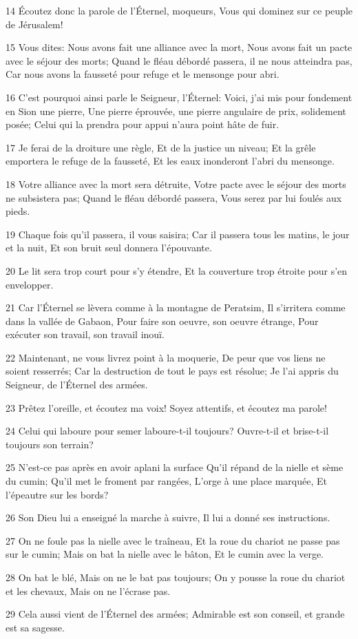 \par 14 Écoutez donc la parole de l'Éternel, moqueurs, Vous qui dominez sur ce peuple de Jérusalem!
\par 15 Vous dites: Nous avons fait une alliance avec la mort, Nous avons fait un pacte avec le séjour des morts; Quand le fléau débordé passera, il ne nous atteindra pas, Car nous avons la fausseté pour refuge et le mensonge pour abri.
\par 16 C'est pourquoi ainsi parle le Seigneur, l'Éternel: Voici, j'ai mis pour fondement en Sion une pierre, Une pierre éprouvée, une pierre angulaire de prix, solidement posée; Celui qui la prendra pour appui n'aura point hâte de fuir.
\par 17 Je ferai de la droiture une règle, Et de la justice un niveau; Et la grêle emportera le refuge de la fausseté, Et les eaux inonderont l'abri du mensonge.
\par 18 Votre alliance avec la mort sera détruite, Votre pacte avec le séjour des morts ne subsistera pas; Quand le fléau débordé passera, Vous serez par lui foulés aux pieds.
\par 19 Chaque fois qu'il passera, il vous saisira; Car il passera tous les matins, le jour et la nuit, Et son bruit seul donnera l'épouvante.
\par 20 Le lit sera trop court pour s'y étendre, Et la couverture trop étroite pour s'en envelopper.
\par 21 Car l'Éternel se lèvera comme à la montagne de Peratsim, Il s'irritera comme dans la vallée de Gabaon, Pour faire son oeuvre, son oeuvre étrange, Pour exécuter son travail, son travail inouï.
\par 22 Maintenant, ne vous livrez point à la moquerie, De peur que vos liens ne soient resserrés; Car la destruction de tout le pays est résolue; Je l'ai appris du Seigneur, de l'Éternel des armées.
\par 23 Prêtez l'oreille, et écoutez ma voix! Soyez attentifs, et écoutez ma parole!
\par 24 Celui qui laboure pour semer laboure-t-il toujours? Ouvre-t-il et brise-t-il toujours son terrain?
\par 25 N'est-ce pas après en avoir aplani la surface Qu'il répand de la nielle et sème du cumin; Qu'il met le froment par rangées, L'orge à une place marquée, Et l'épeautre sur les bords?
\par 26 Son Dieu lui a enseigné la marche à suivre, Il lui a donné ses instructions.
\par 27 On ne foule pas la nielle avec le traîneau, Et la roue du chariot ne passe pas sur le cumin; Mais on bat la nielle avec le bâton, Et le cumin avec la verge.
\par 28 On bat le blé, Mais on ne le bat pas toujours; On y pousse la roue du chariot et les chevaux, Mais on ne l'écrase pas.
\par 29 Cela aussi vient de l'Éternel des armées; Admirable est son conseil, et grande est sa sagesse.

